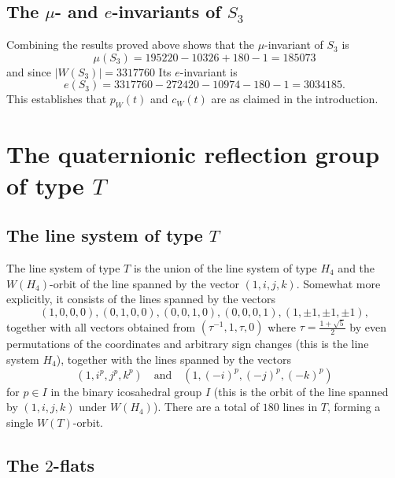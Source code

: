 \documentclass[11pt, reqno]{amsart}
\numberwithin{equation}{section}
\theoremstyle{definition}
\theoremstyle{plain}
\begin{document}
\subsection{The $\mu$- and $e$-invariants of $S_3$} Combining the results proved above shows that the $\mu$-invariant of $S_3$ is
$$\mu(S_3)=195220-10326+180-1=185073$$ and since $|W(S_3)|=3317760$ Its $e$-invariant is
$$e(S_3)=3317760-272420-10974-180-1=3034185.$$ This establishes that $p_W(t)$ and $c_W(t)$ are as claimed in the introduction. 


\section{The quaternionic reflection group of type $T$}

\subsection{The line system of type $T$}

The line system of type $T$ is the union of the line system of type $H_4$ and the $W(H_4)$-orbit of the line spanned by the vector $(1,i,j,k)$. Somewhat more explicitly, it consists of the lines spanned by the vectors
$$(1,0,0,0),(0,1,0,0),(0,0,1,0),(0,0,0,1),(1,\pm 1, \pm 1, \pm 1),$$ together with all vectors obtained from $(\tau^{-1},1,\tau,0)$ where $\tau=\frac{1+\sqrt{5}}{2}$  by even permutations of the coordinates and arbitrary sign changes (this is the line system $H_4$), together with the lines spanned by the vectors 
$$(1,i^p,j^p,k^p) \quad \text{and} \quad (1,(-i)^p,(-j)^p,(-k)^p)$$ for $p \in I$ in the binary icosahedral group $I$ (this is the orbit of the line spanned by $(1,i,j,k)$ under $W(H_4)$). There are a total of $180$ lines in $T$, forming a single $W(T)$-orbit.

\subsection{The $2$-flats} 
\end{document}
